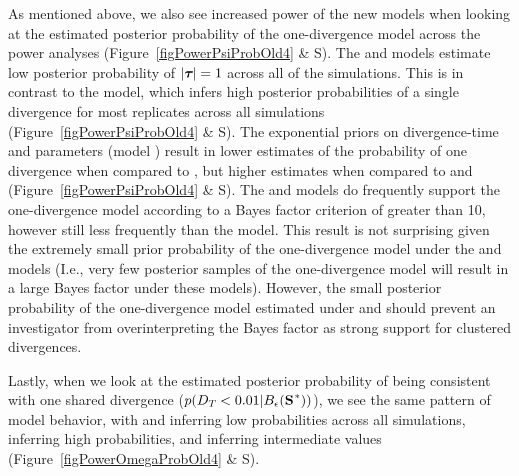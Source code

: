 As mentioned above, we also see increased power of the new models when
looking at the estimated posterior probability of the one-divergence model
across the power analyses 
(Figure~\ref{figPowerPsiProbOld4} \& 
S).
The \modelDPP and \modelUniform models estimate low posterior probability of
$\lvert \boldsymbol{\tau_{}} \rvert = 1$ across all of the simulations.
This is in contrast to the \modelOld model, which infers high posterior probabilities of a single
divergence for most replicates across all simulations
(Figure~\ref{figPowerPsiProbOld4} \& 
S).
The exponential priors on divergence-time and \myTheta{} parameters (model
\modelUshaped) result in lower estimates of the probability of one divergence
when compared to \modelOld, but higher estimates when compared to \modelUniform
and \modelDPP
(Figure~\ref{figPowerPsiProbOld4} \& 
S).
The \modelDPP and \modelUniform models do frequently support the one-divergence
model according to a Bayes factor criterion of greater than 10, however still
less frequently than the \modelOld model.
This result is not surprising given the extremely small prior probability of
the one-divergence model under the \modelDPP and \modelUniform models (I.e.,
very few posterior samples of the one-divergence model will result in a
large Bayes factor under these models).
However, the small posterior probability of the one-divergence model estimated
under \modelDPP and \modelUniform should prevent an investigator from
overinterpreting the Bayes factor as strong support for clustered divergences.

Lastly, when we look at the estimated posterior probability of
\divTimeDispersion being consistent with one shared divergence
($p(\divTimeDispersion < 0.01 | \ssSpace)$), we see the same pattern of model
behavior, with \modelDPP and \modelUniform inferring low probabilities across
all simulations, \modelOld inferring high probabilities, and \modelUshaped
inferring intermediate values
(Figure~\ref{figPowerOmegaProbOld4} \& 
S).

